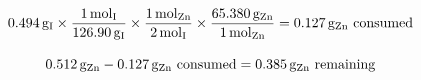 \documentclass[titlepage]{article}
\begin{document}
\begin{gather*}
    \qty{0.494}{\gram\of{I}}\times\frac{\qty{1}{\mol\of{I}}}{\qty{126.90}{\gram\of{I}}}\times\frac{\qty{1}{\mol\of{Zn}}}{\qty{2}{\mol\of{I}}}\times\frac{\qty{65.380}{\gram\of{Zn}}}{\qty{1}{\mol\of{Zn}}}=\qty{0.127}{\gram\of{Zn}}\mathrm{\ consumed} \\[2ex]
    \qty{0.512}{\gram\of{Zn}}-\qty{0.127}{\gram\of{Zn}}\mathrm{\ consumed}=\qty{0.385}{\gram\of{Zn}}\mathrm{\ remaining}
\end{gather*}

\end{document}
